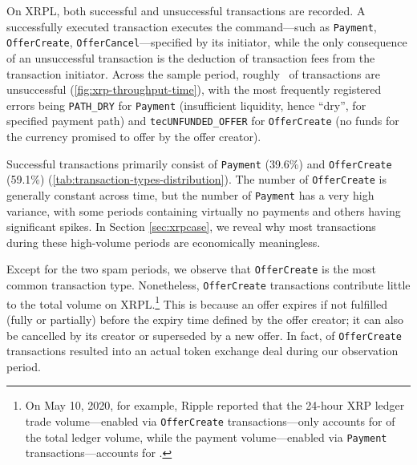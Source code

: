 On XRPL, both successful and unsuccessful transactions are recorded. A successfully executed transaction executes the command---such as \texttt{Payment}, \texttt{OfferCreate}, \texttt{OfferCancel}---specified by its initiator, while the only consequence of an unsuccessful transaction is the deduction of transaction fees from the transaction initiator.
Across the sample period, roughly~ of transactions are unsuccessful (\autoref{fig:xrp-throughput-time}), with the most frequently registered errors being \texttt{PATH\_DRY} for \texttt{Payment} (insufficient liquidity, hence ``dry'', for specified payment path) and \texttt{tecUNFUNDED\_OFFER} for \texttt{OfferCreate} (no funds for the currency promised to offer by the offer creator). 

Successful transactions primarily consist of \texttt{Payment} (39.6\%) and \texttt{OfferCreate} (59.1\%) (\autoref{tab:transaction-types-distribution}). The number of \texttt{OfferCreate} is generally constant across time, but the number of \texttt{Payment} has a very high variance, with some periods containing virtually no payments and others having significant spikes. 
In Section \ref{sec:xrpcase}, we reveal why most transactions during these high-volume periods are economically meaningless. 

Except for the two spam periods, we observe that \texttt{OfferCreate} is the most common transaction type. 
Nonetheless, \texttt{OfferCreate} transactions contribute little to the total volume on XRPL.\footnote{
On May 10, 2020, for example, Ripple reported that the 24-hour XRP ledger trade volume---enabled via \texttt{OfferCreate} transactions---only accounts for  of the total ledger volume, while the payment volume---enabled via \texttt{Payment} transactions---accounts for .
} This is because an offer expires if not fulfilled (fully or partially) before the expiry time defined by the offer creator; it can also be cancelled by its creator or superseded by a new offer. In fact,  of \texttt{OfferCreate} transactions resulted into an actual token exchange deal during our observation period. 



